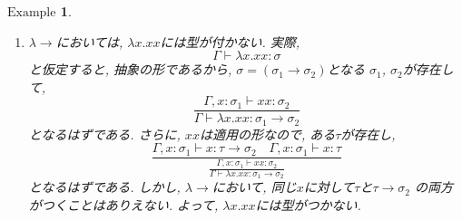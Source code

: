 \documentclass[11pt]{jsreport}
\theoremstyle{mystyle}
\newtheorem{df}{$\textrm{Definition}$}[subsection]
\newtheorem{ex}[df]{$\textrm{Example}$}
\newcommand{\T}{\mathbb{T}}
\newcommand{\lama}{\lambda \! \! \to}
\newcommand{\0}{\textbf{0}}
\newcommand{\1}{\textbf{1}}
\newcommand{\2}{\textbf{2}}
\begin{document}
\begin{ex}
\begin{enumerate}
    \item $\lama$においては, $\lambda x . xx$には型が付かない. 実際, 
    \[
      \Gamma \vdash \lambda x. xx \colon \sigma
    \]
    と仮定すると, 抽象の形であるから, $\sigma = (\sigma_1 \to \sigma_2)$となる
    $\sigma_1$, $\sigma_2$が存在して, 
    \[
      \frac{\Gamma, x \colon \sigma_1 \vdash xx \colon \sigma_2}
      {\Gamma \vdash \lambda x. xx \colon \sigma_1 \to \sigma_2}
    \]
    となるはずである. さらに, $xx$は適用の形なので, ある$\tau$が存在し, 
    \[
      \frac{\Gamma, x \colon \sigma_1 \vdash x \colon \tau \to \sigma_2
      \quad \Gamma, x \colon \sigma_1 \vdash x \colon \tau}
      {\displaystyle{\frac{\Gamma, x \colon \sigma_1 \vdash xx \colon \sigma_2}
      {\Gamma \vdash \lambda x. xx \colon \sigma_1 \to \sigma_2}}}
    \]
    となるはずである. しかし, $\lama$において, 同じ$x$に対して$\tau$と$\tau \to \sigma_2$
    の両方がつくことはありえない. よって, $\lambda x .xx$には型がつかない. 
  \end{enumerate}
\end{ex}
%
\end{document}
